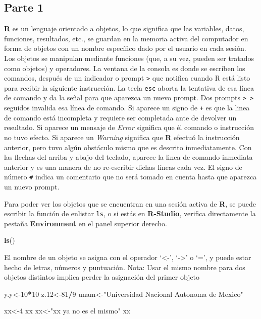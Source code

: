 \documentclass[
]{article}
\newenvironment{Shaded}{\begin{snugshade}}{\end{snugshade}}
\newcommand{\DecValTok}[1]{\textcolor[rgb]{0.00,0.00,0.81}{#1}}
\newcommand{\FloatTok}[1]{\textcolor[rgb]{0.00,0.00,0.81}{#1}}
\newcommand{\KeywordTok}[1]{\textcolor[rgb]{0.13,0.29,0.53}{\textbf{#1}}}
\newcommand{\NormalTok}[1]{#1}
\newcommand{\OperatorTok}[1]{\textcolor[rgb]{0.81,0.36,0.00}{\textbf{#1}}}
\newcommand{\StringTok}[1]{\textcolor[rgb]{0.31,0.60,0.02}{#1}}
\begin{document}
\hypertarget{parte-1}{%
\subsection{Parte 1}\label{parte-1}}

\textbf{R} es un lenguaje orientado a objetos, lo que significa que las
variables, datos, funciones, resultados, etc., se guardan en la memoria
activa del computador en forma de objetos con un nombre específico dado
por el usuario en cada sesión. Los objetos se manipulan mediante
funciones (que, a su vez, pueden ser tratados como objetos) y
operadores. La ventana de la consola es donde se escriben los comandos,
después de un indicador o prompt \texttt{\textgreater{}} que notifica
cuando R está listo para recibir la siguiente instrucción. La tecla
\texttt{esc} aborta la tentativa de esa línea de comando y da la señal
para que aparezca un nuevo prompt. Dos prompts
\texttt{\textgreater{}\ \textgreater{}} seguidos invalida esa línea de
comando. Si aparece un signo de \texttt{+} es que la linea de comando
está incompleta y requiere ser completada ante de devolver un resultado.
Si aparece un mensaje de \emph{Error} significa que él comando o
instrucción no tuvo efecto. Si aparece un \emph{Warning} significa que
\textbf{R} efectuó la instrucción anterior, pero tuvo algún obstáculo
mismo que es descrito inmediatamente. Con las flechas del arriba y abajo
del teclado, aparece la linea de comando inmediata anterior y es una
manera de no re-escribir dichas líneas cada vez. El signo de número
\texttt{\#} indica un comentario que no será tomado en cuenta hasta que
aparezca un nuevo prompt.

Para poder ver los objetos que se encuentran en una sesión activa de
\textbf{R}, se puede escribir la función de enlistar \texttt{ls}, o si
estás en \textbf{R-Studio}, verifica directamente la pestaña
\textbf{Environment} en el panel superior derecho.

\begin{Shaded}
\begin{Highlighting}[]
\KeywordTok{ls}\NormalTok{()}
\end{Highlighting}
\end{Shaded}

El nombre de un objeto se asigna con el operador `\textless-',
`-\textgreater{}' o `=', y puede estar hecho de letras, números y
puntuación. Nota: Usar el mismo nombre para dos objetos distintos
implica perder la asignación del primer objeto

\begin{Shaded}
\begin{Highlighting}[]
\NormalTok{y.y<-}\DecValTok{10}\OperatorTok{*}\DecValTok{10}
\NormalTok{z}\FloatTok{.12}\NormalTok{<-}\DecValTok{81}\OperatorTok{/}\DecValTok{9}
\NormalTok{unam<-}\StringTok{"Universidad Nacional Autonoma de Mexico"}

\NormalTok{xx<-}\DecValTok{4}
\NormalTok{xx}
\NormalTok{xx<-}\StringTok{"xx ya no es el mismo"}
\NormalTok{xx}
\end{Highlighting}
\end{Shaded}
\end{document}
